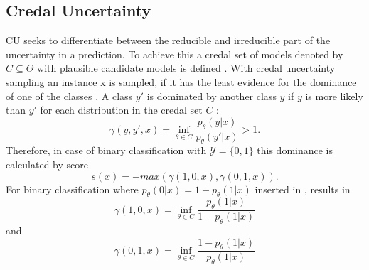 \subsection{Credal Uncertainty}  
\label{subsec:credal_uncertainty}
%
\Ac{CU} seeks to differentiate between the reducible and irreducible part of the uncertainty in a prediction.
To achieve this a credal set of models denoted by $C \subseteq \Theta$ with plausible candidate models is defined \cite{nguyen2021howtomeasure}.
With credal uncertainty sampling an instance x is sampled, if it has the least evidence for the dominance of one of the classes \cite{nguyen2021howtomeasure}.
A class $y'$ is dominated by another class $y$ if $y$ is more likely than $y'$ for each distribution in the credal set $C$ \cite{nguyen2021howtomeasure}:
\begin{equation} \label{eq:credal_uncertainty_dominance}
\gamma(y,y',x) = \inf_{\theta \in C} \frac{p_{\theta}(y | x)}{p_{\theta}(y' | x)} > 1.
\end{equation} 
Therefore, in case of binary classification with $\mathcal{Y} = \{0, 1\}$ this dominance is calculated by score
\begin{equation}
    s(x) = -max (\gamma(1,0,x), \gamma(0,1,x)).
\end{equation} 
For binary classification where $p_{\theta}(0|x) = 1 - p_{\theta}(1|x)$ inserted in , results in  
\begin{equation}
\gamma(1,0,x) = \inf_{\theta \in C} \frac{p_{\theta}(1 | x)}{1 - p_{\theta}(1 | x)}
\end{equation} 
and
\begin{equation}
\gamma(0,1,x) = \inf_{\theta \in C} \frac{1 - p_{\theta}(1 | x)}{p_{\theta}(1 | x)}
\end{equation} 
\clearpage
